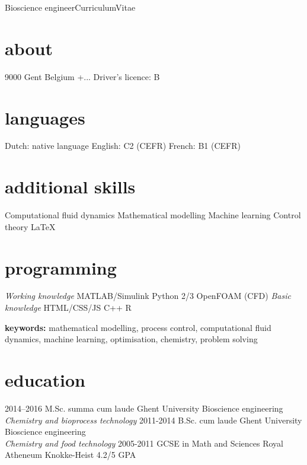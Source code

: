 \documentclass[]{friggeri-cv}
\begin{document}
       {Bioscience engineer}{Curriculum}{Vitae}
\begin{aside}
  \section{about}
    9000 Gent
    Belgium \vspace{0.21cm}
    +...
     \vspace{0.21cm}
    Driver's licence: B \vspace{-1.25mm}
  \section{languages}
    Dutch: native language
    English: C2 (CEFR)
    French:  B1  (CEFR) \vspace{3.3mm}
  \section{additional skills}
  Computational fluid dynamics
  Mathematical modelling
  Machine learning
  Control theory 
  LaTeX \vspace{3.3mm}
  \section{programming} 
  \textit{Working knowledge}
  MATLAB/Simulink
  Python 2/3
  OpenFOAM (CFD) \vspace{0.15cm}
  \textit{Basic knowledge}
  HTML/CSS/JS
  C++
  R
\end{aside}
\vspace{3mm}
\textbf{keywords:} mathematical modelling, process control, computational fluid dynamics, machine learning, optimisation, chemistry, problem solving
\vspace{3mm}

\section{education}
\begin{entrylist}
    \entry
    {2014–2016}
    {M.Sc. summa cum laude}
    {Ghent University}
    {Bioscience engineering\\
    \emph{Chemistry and bioprocess technology}}
  \entry
    {2011-2014}
    {B.Sc. cum laude}
    {Ghent University}
    {Bioscience engineering\\
    \emph{Chemistry and food technology}}
  \entry
    {2005-2011}
    {GCSE in Math and Sciences}
    {Royal Atheneum Knokke-Heist}
    {4.2/5 GPA}
\end{entrylist}
\end{document}
